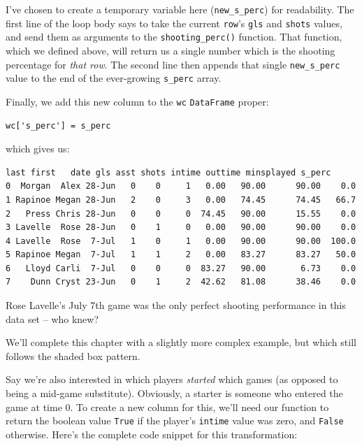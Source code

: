 I've chosen to create a temporary variable here (\texttt{new\_s\_perc}) for
readability. The first line of the loop body says to take the current
\texttt{row}'s \texttt{gls} and \texttt{shots} values, and send them as
arguments to the \texttt{shooting\_perc()} function. That function, which we
defined above, will return us a single number which is the shooting percentage
for \textit{that row}. The second line then appends that single
\texttt{new\_s\_perc} value to the end of the ever-growing \texttt{s\_perc}
array.

Finally, we add this new column to the \texttt{wc} \texttt{DataFrame} proper:

\begin{Verbatim}[fontsize=\small,samepage=true,frame=single,framesep=3mm]
wc['s_perc'] = s_perc
\end{Verbatim}

which gives us:

\begin{Verbatim}[fontsize=\CBCodeSmall,samepage=true,frame=leftline,framesep=5mm,framerule=1mm]
     last first   date gls asst shots intime outtime minsplayed s_perc
0  Morgan  Alex 28-Jun   0    0     1   0.00   90.00      90.00    0.0
1 Rapinoe Megan 28-Jun   2    0     3   0.00   74.45      74.45   66.7
2   Press Chris 28-Jun   0    0     0  74.45   90.00      15.55    0.0
3 Lavelle  Rose 28-Jun   0    1     0   0.00   90.00      90.00    0.0
4 Lavelle  Rose  7-Jul   1    0     1   0.00   90.00      90.00  100.0
5 Rapinoe Megan  7-Jul   1    1     2   0.00   83.27      83.27   50.0
6   Lloyd Carli  7-Jul   0    0     0  83.27   90.00       6.73    0.0
7    Dunn Cryst 23-Jun   0    1     2  42.62   81.08      38.46    0.0
\end{Verbatim}

Rose Lavelle's July 7th game was the only perfect shooting performance in this
data set -- who knew?

\bigskip

We'll complete this chapter with a slightly more complex example, but which
still follows the shaded box pattern.

Say we're also interested in which players \textit{started} which games (as
opposed to being a mid-game substitute). Obviously, a starter is someone who
entered the game at time 0. To create a new column for this, we'll need our
function to return the boolean value \texttt{True} if the player's
\texttt{intime} value was zero, and \texttt{False} otherwise. Here's
the complete code snippet for this transformation:

